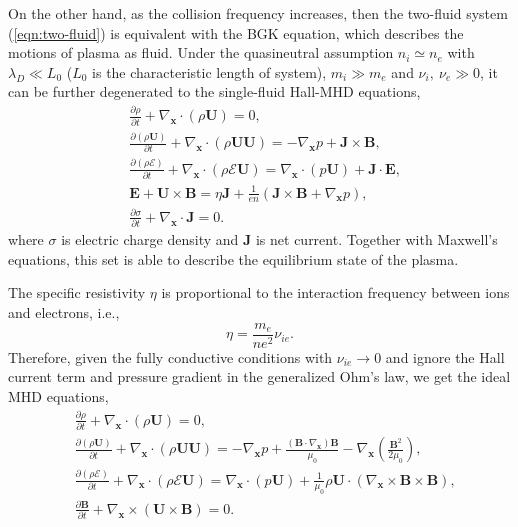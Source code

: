 \documentclass[preprint,3p,12pt,sort&compress]{elsarticle}
\begin{document}
On the other hand, as the collision frequency increases, then the two-fluid system (\ref{eqn:two-fluid}) is equivalent with the BGK equation, which describes the motions of plasma as fluid.
Under the quasineutral assumption $n_i\simeq n_e$ with $\lambda_D\ll L_0$ ($L_0$ is the characteristic length of system), $m_i \gg m_e$ and $\nu_i,\ \nu_e \gg 0$, it can be further degenerated to the single-fluid Hall-MHD equations,
\begin{equation}
\begin{aligned}
&\frac{\partial \rho}{\partial t} + \nabla_{\mathbf{x}} \cdot(\rho \mathbf{U})=0,\\
&\frac{\partial (\rho \mathbf U)}{\partial t} + \nabla_{\mathbf{x}} \cdot\left(\rho \mathbf{U} \mathbf{U}\right)=-\nabla_\mathbf x p + \mathbf{J} \times \mathbf{B},\\
&\frac{\partial (\rho \mathscr E) }{\partial t}+\nabla_\mathbf x \cdot (\rho \mathscr E \mathbf U) = \nabla_\mathbf x \cdot (p\mathbf U ) + \mathbf J \cdot \mathbf E ,\\
&\mathbf{E}+\mathbf{U} \times \mathbf{B}=\eta \mathbf{J}+\frac{1}{en} (\mathbf{J} \times \mathbf{B}+\nabla_{\mathbf{x}} p),\\
&\frac{\partial \sigma}{\partial t} + \nabla_{\mathbf{x}} \cdot \mathbf{J}=0.
\end{aligned}
\end{equation}
where $\sigma$ is electric charge density and $\mathbf J$ is net current.
Together with Maxwell’s equations, this set is able to describe the equilibrium state of the plasma. 

The specific resistivity $\eta$ is proportional to the interaction frequency between ions and electrons, i.e.,
\begin{equation}
\eta=\frac{m_e}{ne^2}\nu_{ie}.
\end{equation}
Therefore, given the fully conductive conditions with $\nu_{ie} \to 0$ and ignore the Hall current term and pressure gradient in the generalized Ohm's law, we get the ideal MHD equations,
\begin{equation}
\begin{aligned}
&\frac{\partial \rho}{\partial t} + \nabla_{\mathbf{x}} \cdot(\rho \mathbf{U})=0,\\
&\frac{\partial (\rho \mathbf U)}{\partial t} + \nabla_{\mathbf{x}} \cdot\left(\rho \mathbf{U} \mathbf{U}\right)=-\nabla_\mathbf x p + \frac{\left(\mathbf{B} \cdot \nabla_{\mathbf{x}}\right) \mathbf{B}}{\mu_{0}}-\nabla_{\mathbf{x}}\left(\frac{\mathbf{B}^{2}}{2 \mu_{0}}\right),\\
&\frac{\partial (\rho \mathscr E) }{\partial t}+\nabla_\mathbf x \cdot (\rho \mathscr E \mathbf U) = \nabla_\mathbf x \cdot (p\mathbf U ) + \frac{1}{\mu_{0}} \rho \mathbf{U} \cdot\left(\nabla_{\mathbf{x}} \times \mathbf{B} \times \mathbf{B}\right) ,\\
&\frac{\partial \mathbf B}{\partial t}+\nabla_\mathbf x \times (\mathbf U \times \mathbf{B})=0.
\end{aligned}
\end{equation}
\end{document}

